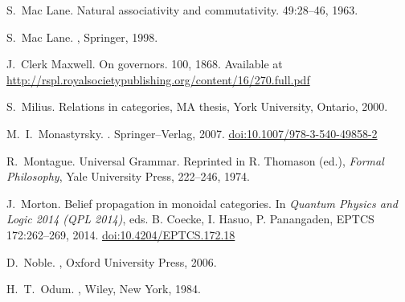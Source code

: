 \begin{thebibliography}{RSW00}
    S.\ Mac Lane.
    \newblock Natural associativity and commutativity.
     { 49}:28--46, 1963. 


    S.\ Mac Lane.
    ,
    Springer, 1998.
    
    J.\ Clerk Maxwell. 
    \newblock On governors.
     { 100}, 1868. 
    \newblock Available at \href{http://rspl.royalsocietypublishing.org/content/16/270.full.pdf}{http://rspl.royalsocietypublishing.org/content/16/270.full.pdf}
    
    S.\ Milius.
    \newblock Relations in categories, MA thesis, York University,
    Ontario, 2000.

    M.\ I.\ Monastyrsky.
    .
    \newblock Springer--Verlag, 2007.
    \newblock \href{http://dx.doi.org/10.1007/978-3-540-49858-2}{doi:10.1007/978-3-540-49858-2}

    R.\ Montague.
    \newblock Universal Grammar.
    \newblock Reprinted in R. Thomason (ed.), {\em Formal Philosophy}, Yale
    University Press, 222--246, 1974. 

    J.\ Morton.
    \newblock Belief propagation in monoidal categories. 
    \newblock In {\em Quantum Physics and Logic 2014 (QPL 2014)}, eds. B.
    Coecke, I. Hasuo, P. Panangaden, EPTCS 172:262--269, 2014.  
    \newblock
    \href{http://dx.doi.org/10.4204/EPTCS.172.18}{doi:10.4204/EPTCS.172.18 }
    
    D.\ Noble.
    , Oxford
    University Press, 2006.


    H.\ T.\ Odum.
    , Wiley, New York, 1984.


\end{thebibliography}
